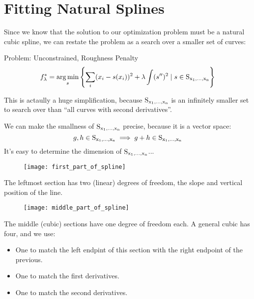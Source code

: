 \section{Fitting Natural Splines}
%
%
\begin{frame}
  Since we know that the solution to our optimization problem must be a natural cubic spline, we can restate the problem as a search over a smaller set of curves:
  \begin{block}{Problem: Unconstrained, Roughness Penalty}
    $$ f_{\lambda}^* = \operatorname*{arg\,min}_{s} \left\{ \sum_i (x_i - s(x_i))^2 + \lambda \int (s'')^2 \mid s \in \operatorname*{S_{x_1, \ldots, x_n}} \right\} $$
  \end{block}
\end{frame}
%
%
\begin{frame}
  This is actaully a huge simplification, because $\operatorname*{S_{x_1, \ldots, x_n}}$ is an infinitely smaller set to search over than ``all curves with second derivatives''.
\end{frame}
%
%
\begin{frame}
  We can make the smallness of $\operatorname*{S_{x_1, \ldots, x_n}}$ precise, because it is a vector space:
  $$ g, h \in \operatorname*{S_{x_1, \ldots, x_n}} \implies g + h \in \operatorname*{S_{x_1, \ldots, x_n}} $$
  It's easy to determine the dimension of $\operatorname*{S_{x_1, \ldots, x_n}}$... 
\end{frame}
%
%
\begin{frame}
	\begin{figure}
    \texttt{[image: first\_part\_of\_spline]}
	\end{figure}
  The leftmost section has two (linear) degrees of freedom, the slope and vertical position of the line.
\end{frame}
%
%
\begin{frame}
	\begin{figure}
    \texttt{[image: middle\_part\_of\_spline]}
	\end{figure}
  The middle (cubic) sections have one degree of freedom each.  A general cubic has four, and we use:
  \begin{itemize}
    \item One to match the left endpint of this section with the right endpoint of the previous.
    \item One to match the first derivatives.
    \item One to match the second derivatives.
  \end{itemize}
\end{frame}
%
%
